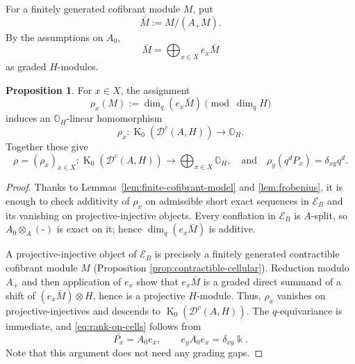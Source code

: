 \documentclass[11pt]{article}
\theoremstyle{definition}
\newtheorem{prop}[thm]{Proposition}
\numberwithin{equation}{section}
\newcommand{\kk}{\Bbbk}
\newcommand{\Dc}{\mathcal{D}^c(A,H)}
\newcommand{\K}{\operatorname{K}_0}
\newcommand{\Ecat}{\mathcal{E}_B}
\newcommand{\OH}{\mathbb{O}_H}
\begin{document}

For a finitely generated cofibrant module $M$, put
\begin{equation}\label{eq:bar-reduction}
\bar M:=M/(A_+M).
\end{equation}
By the assumptions on $A_0$,
\begin{equation}\label{eq:bar-decomposition}
\bar M=\bigoplus_{x\in X}e_x\bar M
\end{equation}
as graded $H$-modules.

\begin{prop}\label{prop:rank-character}
For $x\in X$, the assignment
\[
\rho_x(M):=
\operatorname{dim}_q(e_x\bar M)
\pmod{\operatorname{dim}_qH}
\]
induces an $\OH$-linear homomorphism
\[
\rho_x:\K(\Dc)\longrightarrow\OH.
\]
Together these give
\begin{equation}\label{eq:rank-on-cells}
\rho=(\rho_x)_{x\in X}:
\K(\Dc)\longrightarrow\bigoplus_{x\in X}\OH,
\quad
\textrm{and}
\quad
\rho_y(q^dP_x)=\delta_{xy}q^d.
\end{equation}
\end{prop}

\begin{proof}
Thanks to
Lemmas~\ref{lem:finite-cofibrant-model} and \ref{lem:frobenius},
it is enough to check additivity of $\rho_x$ on admissible short exact sequences in $\Ecat$ and its vanishing on
projective-injective objects.  Every conflation in $\Ecat$ is
$A$-split, so $A_0\otimes_A(\mbox{-})$ is exact on it; hence
$\operatorname{dim}_q(e_x\bar M)$ is additive.

A projective-injective object of $\Ecat$ is precisely a finitely generated
contractible cofibrant module $M$ (Proposition \ref{prop:contractible-cellular}). 
Reduction modulo $A_+$ and then application of $e_x$ show that
$e_x\bar M$ is a graded direct summand of a shift of
$(e_x\bar M)\otimes H$, hence is a projective $H$-module.
Thus, $\rho_x$ vanishes on projective-injectives and descends to
$\K(\Dc)$.  
The $q$-equivariance is immediate, and \eqref{eq:rank-on-cells} follows from
\[
\bar{P_x}=A_0e_x,
\qquad
e_yA_0e_x=\delta_{xy}\kk.
\]
Note that this argument does not need any grading gaps.
\end{proof}
\end{document}
